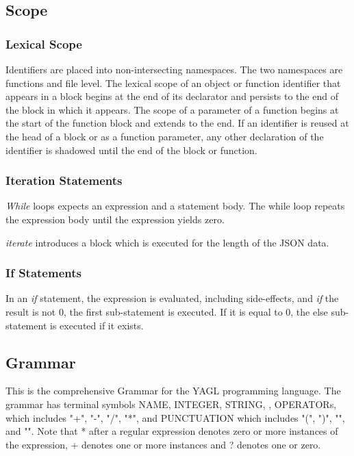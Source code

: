 \documentclass[12pt]{article}
\begin{document}
\subsection{Scope}

\subsubsection{Lexical Scope}
Identifiers are placed into non-intersecting namespaces.  The two namespaces are functions and file level.  The lexical scope of an object or function identifier that appears in a block begins at the end of its declarator and persists to the end of the block in which it appears.  The scope of a parameter of a function begins at the start of the function block and extends to the end.  If an identifier is reused at the head of a block or as a function parameter, any other declaration of the identifier is shadowed until the end of the block or function. 

\subsubsection{Iteration Statements}
\textit{While} loops expects an expression and a statement body. The while loop repeats the expression body until the expression yields zero.

\textit{iterate} introduces a block which is executed 
for the length of the JSON data. 

\subsubsection{If Statements}

In an \textit{if} statement, the expression is evaluated, including side-effects, and \textit{if} the result is not 0, the first sub-statement is executed. If it is equal to 0, the else sub-statement is executed if it exists.

\subsection{Grammar}
This is the comprehensive Grammar for the YAGL programming language. The grammar has terminal symbols NAME, INTEGER, STRING, , OPERATORs, which includes "+", "-", "/", "*", and PUNCTUATION which includes "(", ")", "{", and "}". Note that * after a regular expression denotes zero or more instances of the expression, + denotes one or more instances and ? denotes one or zero.
\end{document}
